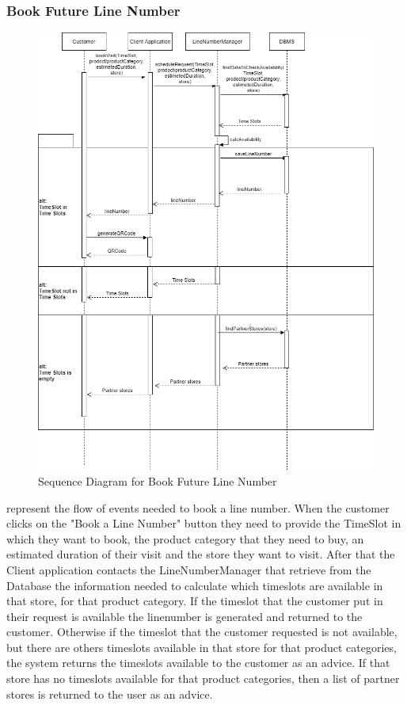 \subsubsection{Book Future Line Number}
\begin{figure}[H]
    \centering
    \includegraphics[height=0.4\textwidth]{Images/CustomerSequenceDiagrams/BookLineNumberSequenceDiagram.png}
    \caption{Sequence Diagram for Book Future Line Number}
    \label{fig:SDBookLineNumber}
\end{figure}
 represent the flow of events needed to book a line number.
When the customer clicks on the "Book a Line Number" button they need  to provide the TimeSlot in which they want to book, the product category that they need to buy, an estimated duration of their visit and the store they want to visit.
After that the Client application contacts the LineNumberManager that retrieve from the Database the information needed to calculate which timeslots are available in that store, for that product category.
If the timeslot that the customer put in their request is available the linenumber is generated and returned to the customer.
Otherwise if the timeslot that the customer requested is not available, but there are others timeslots available in that store for that product categories, the system returns the timeslots available to the customer as an advice.
If that store has no timeslots available for that product categories, then a list of partner stores is returned to the user as an advice.

